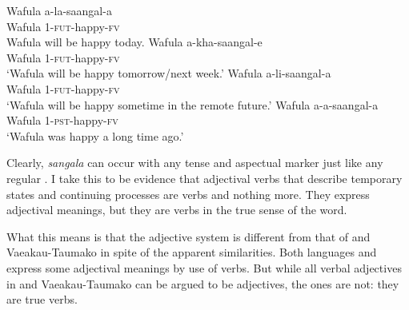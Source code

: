\documentclass[output=paper,
modfonts
]{langscibook}
\begin{document}
\ea\label{ex:wasike:25}
\ea
\gll Wafula a-la-saangal-a\\
     Wafula 1-\textsc{fut}-happy-\textsc{fv}\\
\glt Wafula will be happy today.
\ex
\gll  Wafula a-kha-saangal-e\\
     Wafula 1-\textsc{fut}-happy-\textsc{fv}\\
\glt ‘Wafula will be happy tomorrow/next week.’
\ex
\gll  Wafula a-li-saangal-a\\
     Wafula 1-\textsc{fut}-happy-\textsc{fv}\\
\glt ‘Wafula will be happy sometime in the remote future.’
\ex
\gll  Wafula a-a-saangal-a\\
     Wafula 1-\textsc{pst}-happy-\textsc{fv}\\
\glt ‘Wafula was happy a long time ago.’
\z
\z

Clearly, \textit{sangala} can occur with any tense and aspectual marker just like any regular . I take this to be evidence that  adjectival verbs that describe temporary states and continuing processes are verbs and nothing more. They express adjectival meanings, but they are verbs in the true sense of the word.

What this means is that the  adjective system is different from that of  and Vaeakau-Taumako in spite of the apparent similarities. Both languages and  express some adjectival meanings by use of verbs. But while all verbal adjectives in  and Vaeakau-Taumako can be argued to be adjectives, the  ones are not: they are true verbs.
\end{document}
